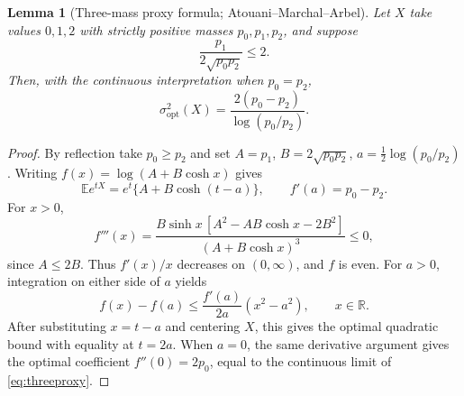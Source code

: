 \documentclass[11pt,a4paper]{article}
\newtheorem{lemma}[theorem]{Lemma}
\newcommand{\E}{\mathbb E}\newcommand{\R}{\mathbb R}\newcommand{\N}{\mathbb N}\newcommand{\one}{\mathbf1}
\begin{document}
\begin{lemma}[Three-mass proxy formula; Atouani--Marchal--Arbel]\label{lem:threemass}
Let $X$ take values $0,1,2$ with strictly positive masses $p_0,p_1,p_2$, and suppose
\[
 \frac{p_1}{2\sqrt{p_0p_2}}\le2.
\]
Then, with the continuous interpretation when $p_0=p_2$,
\begin{equation}\label{eq:threeproxy}
 \sigma^2_{\mathrm{opt}}(X)=\frac{2(p_0-p_2)}{\log(p_0/p_2)}.
\end{equation}
\end{lemma}
\begin{proof}
By reflection take $p_0\ge p_2$ and set $A=p_1$, $B=2\sqrt{p_0p_2}$, $a=\frac12\log(p_0/p_2)$. Writing $f(x)=\log(A+B\cosh x)$ gives
\[
 \E e^{tX}=e^t\{A+B\cosh(t-a)\},\qquad
 f'(a)=p_0-p_2.
\]
For $x>0$,
\[
 f'''(x)=\frac{B\sinh x\,[A^2-AB\cosh x-2B^2]}{(A+B\cosh x)^3}\le0,
\]
since $A\le2B$. Thus $f'(x)/x$ decreases on $(0,\infty)$, and $f$ is even. For $a>0$, integration on either side of $a$ yields
\[
 f(x)-f(a)\le\frac{f'(a)}{2a}(x^2-a^2),\qquad x\in\mathbb R.
\]
After substituting $x=t-a$ and centering $X$, this gives the optimal quadratic bound with equality at $t=2a$. When $a=0$, the same derivative argument gives the optimal coefficient $f''(0)=2p_0$, equal to the continuous limit of \eqref{eq:threeproxy}.
\end{proof}
\end{document}
